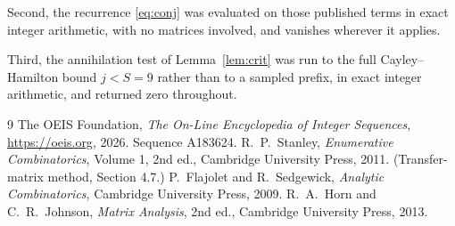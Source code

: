 \documentclass[11pt,a4paper]{article}
\theoremstyle{plain}
\theoremstyle{definition}
\begin{document}
Second, the recurrence \eqref{eq:conj} was evaluated on those published terms in exact
integer arithmetic, with no matrices involved, and vanishes wherever it applies.

Third, the annihilation test of Lemma~\ref{lem:crit} was run to the full Cayley--Hamilton
bound $j<S=9$ rather than to a sampled prefix, in exact integer arithmetic, and returned
zero throughout.

\begin{thebibliography}{9}
 The OEIS Foundation, \emph{The On-Line Encyclopedia of Integer
Sequences}, \url{https://oeis.org}, 2026. Sequence A183624.
 R.~P.~Stanley, \emph{Enumerative Combinatorics}, Volume 1, 2nd ed.,
Cambridge University Press, 2011. (Transfer-matrix method, Section 4.7.)
 P.~Flajolet and R.~Sedgewick, \emph{Analytic Combinatorics}, Cambridge
University Press, 2009.
 R.~A.~Horn and C.~R.~Johnson, \emph{Matrix Analysis}, 2nd ed., Cambridge
University Press, 2013.
\end{thebibliography}
\end{document}
